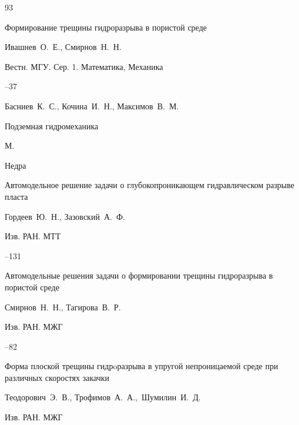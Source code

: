 \begin{thebibliography}{93}

\paper Формирование трещины гидроразрыва в пористой среде

\by   Ивашнев~О.~Е., Смирнов~Н.~Н.

\jour Вестн. МГУ. Сер. 1. Математика, Механика



--37




\by Басниев~К.~С., Кочина~И.~Н., Максимов~В.~М.

\book Подземная гидромеханика

\publaddr М.

\publ Недра






\paper Автомодельное решение задачи о глубокопроникающем гидравлическом разрыве пласта

\by   Гордеев~Ю.~Н., Зазовский~А.~Ф.

\jour Изв. РАН. МТТ



--131




\paper Автомодельные решения задачи о формировании трещины гидроразрыва в пористой среде

\by   Смирнов~Н.~Н., Тагирова~В.~Р.

\jour Изв. РАН. МЖГ



--82











\paper Форма плоской трещины гидрoразрыва в упругой непроницаемой среде при различных скоростях закачки

\by   Теодорович~Э.~В., Трофимов~А.~А.,~Шумилин~И.~Д.

\jour Изв. РАН. МЖГ


\end{thebibliography}
